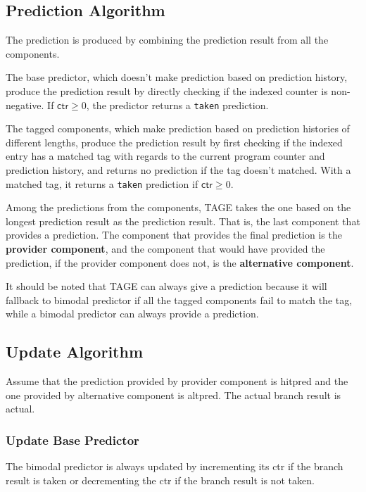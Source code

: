 \documentclass[screen,nonacm]{acmart}
\begin{document}
\subsection{Prediction Algorithm}

The prediction is produced by combining the prediction result from all the components.

The base predictor, which doesn't make prediction based on prediction history,
produce the prediction result by directly checking if the indexed counter is non-negative.
If $\mathsf{ctr} \ge 0$, the predictor returns a \texttt{taken} prediction.

The tagged components, which make prediction based on prediction histories of different lengths,
produce the prediction result by first checking if the indexed entry has a matched tag with regards to the current program counter and prediction history,
and returns no prediction if the tag doesn't matched.
With a matched tag, it returns a \texttt{taken} prediction if $\mathsf{ctr} \ge 0$.

Among the predictions from the components,
TAGE takes the one based on the longest prediction result as the prediction result.
That is, the last component that provides a prediction.
The component that provides the final prediction is the \textbf{provider component},
and the component that would have provided the prediction, if the provider component does not, is the \textbf{alternative component}.


It should be noted that TAGE can always give a prediction because it will fallback
to bimodal predictor if all the tagged components fail to match the tag,
while a bimodal predictor can always provide a prediction.

\subsection{Update Algorithm}


Assume that the prediction provided by provider component is \textsf{hitpred}
and the one provided by alternative component is \textsf{altpred}.
The actual branch result is \textsf{actual}.

\subsubsection{Update Base Predictor}

The bimodal predictor is always updated by incrementing its \textsf{ctr} if the branch result
is \textsf{taken} or decrementing the \textsf{ctr} if the branch result
is \textsf{not taken}.
\end{document}
